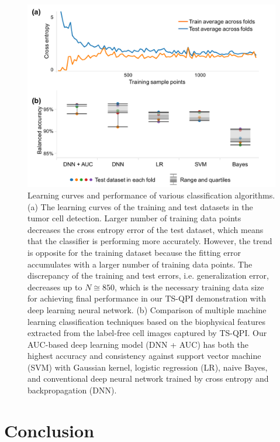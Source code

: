 \documentclass[aps,pra,reprint,superscriptaddress]{revtex4-1}
\begin{document}
\begin{figure}
\includegraphics[scale=0.7]{FigureLearningCurve.pdf}
\caption{\label{fig:LearningCurve} Learning curves and performance of various classification algorithms. (a) The learning curves of the training and test datasets in the tumor cell detection. Larger number of training data points decreases the cross entropy error of the test dataset, which means that the classifier is performing more accurately. However, the trend is opposite for the training dataset because the fitting error accumulates with a larger number of training data points. The discrepancy of the training and test errors, i.e. generalization error, decreases up to $N \cong 850$, which is the necessary training data size for achieving final performance in our TS-QPI demonstration with deep learning neural network. (b) Comparison of multiple machine learning classification techniques based on the biophysical features extracted from the label-free cell images captured by TS-QPI. Our AUC-based deep learning model (DNN + AUC) has both the highest accuracy and consistency against support vector machine (SVM) with Gaussian kernel, logistic regression (LR), naive Bayes, and conventional deep neural network trained by cross entropy and backpropagation (DNN).}
\end{figure}

\section*{Conclusion}
\end{document}
